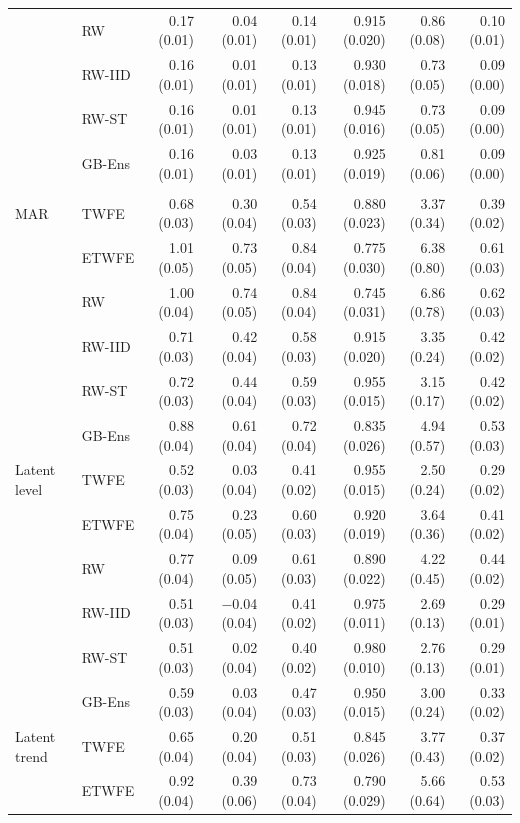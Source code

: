 \begin{table}
\begin{tabular*}{1\linewidth}{@{\extracolsep{\fill}}llrrrrrr}
 & RW & 0.17 (0.01) & 0.04 (0.01) & 0.14 (0.01) & 0.915 (0.020) & 0.86 (0.08) & 0.10 (0.01) \\ 
 & RW-IID & 0.16 (0.01) & 0.01 (0.01) & 0.13 (0.01) & 0.930 (0.018) & 0.73 (0.05) & 0.09 (0.00) \\ 
 & RW-ST & 0.16 (0.01) & 0.01 (0.01) & 0.13 (0.01) & 0.945 (0.016) & 0.73 (0.05) & 0.09 (0.00) \\ 
 & GB-Ens & 0.16 (0.01) & 0.03 (0.01) & 0.13 (0.01) & 0.925 (0.019) & 0.81 (0.06) & 0.09 (0.00) \\ 
\midrule\addlinespace[2.5pt]
\multicolumn{8}{l}{Without covariates, event year 4} \\[2.5pt] 
\midrule\addlinespace[2.5pt]
MAR & TWFE & 0.68 (0.03) & 0.30 (0.04) & 0.54 (0.03) & 0.880 (0.023) & 3.37 (0.34) & 0.39 (0.02) \\ 
 & ETWFE & 1.01 (0.05) & 0.73 (0.05) & 0.84 (0.04) & 0.775 (0.030) & 6.38 (0.80) & 0.61 (0.03) \\ 
 & RW & 1.00 (0.04) & 0.74 (0.05) & 0.84 (0.04) & 0.745 (0.031) & 6.86 (0.78) & 0.62 (0.03) \\ 
 & RW-IID & 0.71 (0.03) & 0.42 (0.04) & 0.58 (0.03) & 0.915 (0.020) & 3.35 (0.24) & 0.42 (0.02) \\ 
 & RW-ST & 0.72 (0.03) & 0.44 (0.04) & 0.59 (0.03) & 0.955 (0.015) & 3.15 (0.17) & 0.42 (0.02) \\ 
 & GB-Ens & 0.88 (0.04) & 0.61 (0.04) & 0.72 (0.04) & 0.835 (0.026) & 4.94 (0.57) & 0.53 (0.03) \\ 
Latent level & TWFE & 0.52 (0.03) & 0.03 (0.04) & 0.41 (0.02) & 0.955 (0.015) & 2.50 (0.24) & 0.29 (0.02) \\ 
 & ETWFE & 0.75 (0.04) & 0.23 (0.05) & 0.60 (0.03) & 0.920 (0.019) & 3.64 (0.36) & 0.41 (0.02) \\ 
 & RW & 0.77 (0.04) & 0.09 (0.05) & 0.61 (0.03) & 0.890 (0.022) & 4.22 (0.45) & 0.44 (0.02) \\ 
 & RW-IID & 0.51 (0.03) & −0.04 (0.04) & 0.41 (0.02) & 0.975 (0.011) & 2.69 (0.13) & 0.29 (0.01) \\ 
 & RW-ST & 0.51 (0.03) & 0.02 (0.04) & 0.40 (0.02) & 0.980 (0.010) & 2.76 (0.13) & 0.29 (0.01) \\ 
 & GB-Ens & 0.59 (0.03) & 0.03 (0.04) & 0.47 (0.03) & 0.950 (0.015) & 3.00 (0.24) & 0.33 (0.02) \\ 
Latent trend & TWFE & 0.65 (0.04) & 0.20 (0.04) & 0.51 (0.03) & 0.845 (0.026) & 3.77 (0.43) & 0.37 (0.02) \\ 
 & ETWFE & 0.92 (0.04) & 0.39 (0.06) & 0.73 (0.04) & 0.790 (0.029) & 5.66 (0.64) & 0.53 (0.03) \\ 

\end{tabular*}
\end{table}
